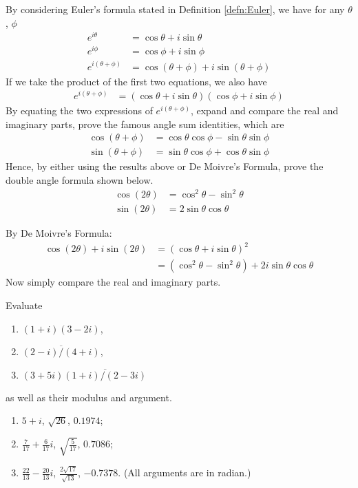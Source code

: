 \begin{Exercise}
By considering Euler's formula stated in Definition \ref{defn:Euler}, we have for any $\theta$, $\phi$
\begin{align*}
e^{i \theta} &= \cos \theta + i \sin \theta \\
e^{i \phi} &= \cos \phi + i \sin \phi \\
e^{i (\theta+\phi)} &= \cos (\theta+\phi) + i \sin (\theta+\phi)
\end{align*}
If we take the product of the first two equations, we also have
\begin{align*}
e^{i (\theta+\phi)} &= (\cos \theta + i \sin \theta)(\cos \phi + i \sin \phi)
\end{align*}
By equating the two expressions of $e^{i (\theta+\phi)}$, expand and compare the real and imaginary parts, prove the famous angle sum identities, which are
\begin{align*}
\cos(\theta+\phi) &= \cos\theta \cos\phi - \sin\theta \sin\phi \\
\sin(\theta+\phi) &= \sin\theta \cos\phi + \cos\theta \sin\phi 
\end{align*}
Hence, by either using the results above or De Moivre's Formula, prove the double angle formula shown below.
\begin{align*}
\cos(2\theta) &= \cos^2\theta - \sin^2\theta \\
\sin(2\theta) &= 2\sin\theta \cos\theta  
\end{align*}
\end{Exercise}
\begin{Answer}
By De Moivre's Formula:
\begin{align*}
\cos(2\theta) + i \sin(2\theta) &= (\cos\theta + i \sin\theta)^2 \\
&= (\cos^2\theta - \sin^2 \theta) + 2i \sin\theta\cos\theta
\end{align*}
Now simply compare the real and imaginary parts.
\end{Answer}

\begin{Exercise}
Evaluate
\begin{enumerate}[label=(\alph*)]
\item $(1+i)(3-2i)$,
\item $\overline{(2-i)/(4+i)}$,
\item $(3+5i)\overline{(1+i)/(2-3i)}$
\end{enumerate}
as well as their modulus and argument.
\end{Exercise}
\begin{Answer}
\begin{enumerate}[label=(\alph*)]
\item $5+i$, $\sqrt{26}$, $0.1974$;
\item $\frac{7}{17}+\frac{6}{17}i$, $\sqrt{\frac{5}{17}}$, $0.7086$;
\item $\frac{22}{13}-\frac{20}{13}i$, $\frac{2\sqrt{17}}{\sqrt{13}}$, $-0.7378$. (All arguments are in radian.)
\end{enumerate}
\end{Answer}

